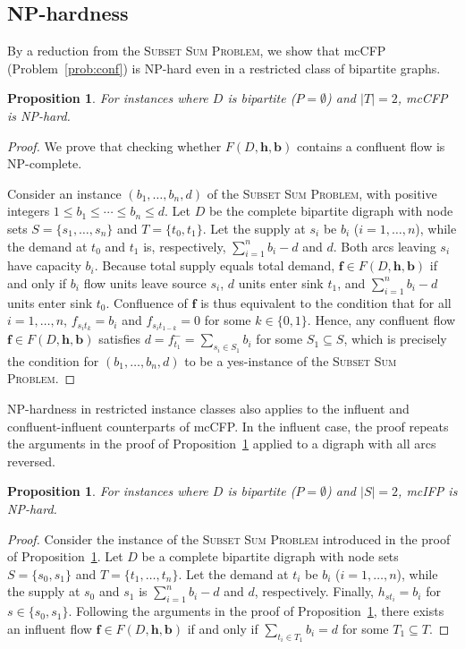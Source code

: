 \documentclass[pdflatex,sn-mathphys-num]{sn-jnl}%
\theoremstyle{thmstyleone}%
\newtheorem{proposition}[theorem]{Proposition}%
\begin{document}
\subsection{NP-hardness} \label{sec:nphard}
By a  reduction from the \textsc{Subset Sum Problem}, 
we show that mcCFP (Problem~\ref{prob:conf}) is NP-hard even in a restricted class of bipartite graphs.
\begin{proposition} \label{prop:conf}
For instances where $D$ is bipartite ($P=\emptyset$) and $|T|=2$, mcCFP is NP-hard.
\end{proposition}
\begin{proof}
We prove that checking whether $F(D,\boldsymbol{h},\boldsymbol{b})$ contains a confluent flow is NP-complete.

Consider an instance $(b_1,\ldots,b_n,d)$ of the \textsc{Subset Sum Problem}, with positive integers $1\leq b_1\leq\cdots\leq b_n\leq d$.
Let $D$ be the complete bipartite digraph with node sets $S=\{s_1,\ldots,s_n\}$ and $T=\{t_0,t_1\}$.
Let the supply at $s_i$ be $b_i$ ($i=1,\ldots,n$), while the demand at $t_0$ and $t_1$ is, respectively, $\sum_{i=1}^nb_i-d$ and $d$.
Both arcs leaving $s_i$ have capacity $b_i$.
Because total supply equals total demand, $\boldsymbol{f}\in F(D,\boldsymbol{h},\boldsymbol{b})$ if and only if $b_i$ flow units leave source $s_i$, $d$ units enter sink $t_1$, and $\sum_{i=1}^nb_i-d$ units enter sink $t_0$.
Confluence of $\boldsymbol{f}$ is thus equivalent to the condition that for all $i=1,\ldots,n$, $f_{s_it_k}=b_i$ and $f_{s_it_{1-k}}=0$ for some $k\in\{0,1\}$.
Hence, any confluent flow $\boldsymbol{f}\in F(D,\boldsymbol{h},\boldsymbol{b})$ satisfies $d=f_{t_1}^-=\sum_{s_i\in S_1}b_i$ for some $S_1\subseteq S$, which is precisely the condition for $(b_1,\ldots,b_n,d)$ to be a yes-instance of the \textsc{Subset Sum Problem}.
\end{proof}

NP-hardness in restricted instance classes also applies to the influent and confluent-influent counterparts of mcCFP.
In the influent case, the proof repeats the arguments in the proof of Proposition~\ref{prop:conf} applied to a digraph with all arcs reversed.
\begin{proposition} \label{prop:inf}
For instances where $D$ is bipartite ($P=\emptyset$) and $|S|=2$, mcIFP is NP-hard.
\end{proposition}
\begin{proof}
Consider the instance of the \textsc{Subset Sum Problem} introduced in the proof of Proposition~\ref{prop:conf}.
Let $D$ be a complete bipartite digraph with node sets $S=\{s_0,s_1\}$ and $T=\{t_1,\ldots,t_n\}$.
Let the demand at $t_i$ be $b_i$ ($i=1,\ldots,n$), while the supply at $s_0$ and $s_1$ is $\sum_{i=1}^nb_i-d$ and $d$, respectively.
Finally, $h_{st_i}=b_i$ for $s\in\{s_0,s_1\}$.
Following the arguments in the proof of Proposition~\ref{prop:conf}, there exists an influent flow $\boldsymbol{f}\in F(D,\boldsymbol{h},\boldsymbol{b})$
if and only if $\sum_{t_i\in T_1}b_i=d$ for some $T_1\subseteq T$.
\end{proof}
\end{document}
